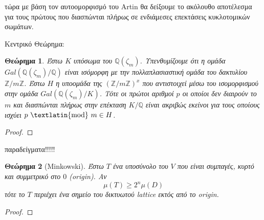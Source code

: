 \documentclass[oneside,a4paper]{article}
\newtheorem{theorem}{Θεώρημα}
\newcommand {\tl}{\textlatin}
\newcommand{\Z}{\mathbb{Z}}
\newcommand{\Q}{\mathbb{Q}}
\begin{document}
τώρα με βάση τον αυτοομορφισμό του \tl{Artin} θα δείξουμε το ακόλουθο αποτέλεσμα για τους πρώτους που διασπώνται πλήρως σε ενδιάμεσες επεκτάσεις κυκλοτομικών σωμάτων.


Κεντρικό Θεώρημα:

\begin{theorem}
	Έστω $K$ υπόσωμα του $\Q (\zeta_m)$. Υπενθυμίζουμε ότι η ομάδα $Gal(\Q (\zeta_m)/ \Q)$ είναι ισόμορφη με την πολλαπλασιαστική ομάδα του δακτυλίου $\Z / m \Z$. Έστω $H$ η υποομάδα της $\left(\Z / m \Z \right)^x$ που αντιστοιχεί μέσω του ισομορφισμού στην ομάδα $Gal(\Q(\zeta_m)/ K)$. Τότε οι πρώτοι αριθμοί $p$ οι οποίοι δεν διαιρούν το $m$ και διασπώνται πλήρως στην επέκταση $K/ \Q$ είναι ακριβώς εκείνοι για τους οποίους ισχύει $ p \text{ \tl{mod} } m \in H$.
\end{theorem}
\begin{proof}
\end{proof}

παραδείγματα!!!!!



\begin{theorem}[\tl{Minkowski}]

	Έστω $T$ ένα υποσύνολο του $V$ που είναι συμπαγές, κυρτό και συμμετρικό στο $0$ (\tl{origin}). Αν $$\mu (T) \geq 2^n \mu (D)$$
	τότε το $T$ περιέχει ένα σημείο του δικτυωτού \tl{lattice} εκτός από το \tl{origin}.
\end{theorem}

\begin{proof}
\end{proof}
\end{document}
